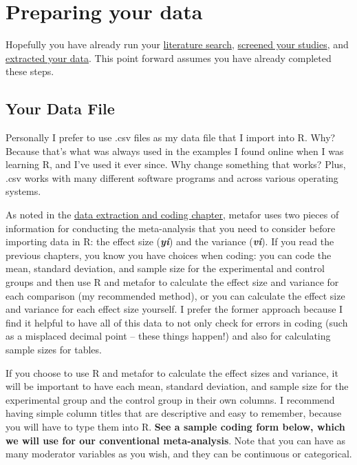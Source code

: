 \documentclass[
]{book}
\begin{document}
\hypertarget{preparing-your-data}{%
\section{Preparing your data}\label{preparing-your-data}}

Hopefully you have already run your \protect\hyperlink{crossliteraturesearch}{literature search}, \protect\hyperlink{crossscreening}{screened your studies}, and \protect\hyperlink{crossdata}{extracted your data}. This point forward assumes you have already completed these steps.

\hypertarget{your-data-file}{%
\subsection{Your Data File}\label{your-data-file}}

Personally I prefer to use .csv files as my data file that I import into R. Why? Because that's what was always used in the examples I found online when I was learning R, and I've used it ever since. Why change something that works? Plus, .csv works with many different software programs and across various operating systems. ~

As noted in the \protect\hyperlink{crossdata}{data extraction and coding chapter}, metafor uses two pieces of information for conducting the meta-analysis that you need to consider before importing data in R: the effect size (\textbf{\emph{yi}}) and the variance (\textbf{\emph{vi}}). If you read the previous chapters, you know you have choices when coding: you can code the mean, standard deviation, and sample size for the experimental and control groups and then use R and metafor to calculate the effect size and variance for each comparison (my recommended method), or you can calculate the effect size and variance for each effect size yourself. I prefer the former approach because I find it helpful to have all of this data to not only check for errors in coding (such as a misplaced decimal point -- these things happen!) and also for calculating sample sizes for tables.

If you choose to use R and metafor to calculate the effect sizes and variance, it will be important to have each mean, standard deviation, and sample size for the experimental group and the control group in their own columns. I recommend having simple column titles that are descriptive and easy to remember, because you will have to type them into R. \textbf{See a sample coding form below, which we will use for our conventional meta-analysis}. Note that you can have as many moderator variables as you wish, and they can be continuous or categorical.
\end{document}
